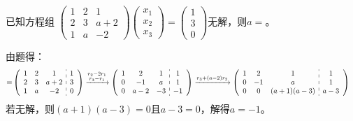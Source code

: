 \documentclass[a4paper]{report}
\begin{document}
\hphantom{~~}

\EX 已知方程组
$
\begin{pmatrix}
1&2&1\\
2&3&a+2\\
1&a&-2
\end{pmatrix}
\begin{pmatrix}
x_1\\ x_2\\ x_3
\end{pmatrix}=
\begin{pmatrix}
1\\ 3\\ 0
\end{pmatrix}
$无解，则$a=$\underline{\hphantom{~~~~~~~~~}}。

\begin{jie}
由题得：
\begin{align*}
[A|B]=&
\left(
 \begin{array}{c:c}
\begin{matrix}
1 & 2 & 1\\
2 & 3 & a+2 \\
1 & a & -2
\end{matrix}&
\begin{matrix}
1  \\
3 \\
0
\end{matrix}
\end{array}
\right)\xrightarrow{\substack{r_{2}-2r_{1}\\ r_{3}-r_{1}}}
{
\left(
 \begin{array}{c:c}
\begin{matrix}
1 & 2 & 1\\
0 & -1 & a \\
0 & a-2 & -3
\end{matrix}&
\begin{matrix}
1  \\
1\\
-1
\end{matrix}
\end{array}
\right)
}\xrightarrow{\substack{ r_{3}+(a-2)r_{2}}}
{
\left(
 \begin{array}{c:c}
\begin{matrix}
1 & 2 & 1\\
0 & -1 & a \\
0 & 0 & (a+1)(a-3)
\end{matrix}&
\begin{matrix}
1  \\
1\\
a-3
\end{matrix}
\end{array}
\right)
}
\end{align*}
若无解，则$(a+1)(a-3)=0$且$a-3=0$，解得$a=-1$。
\end{jie}
\end{document}
